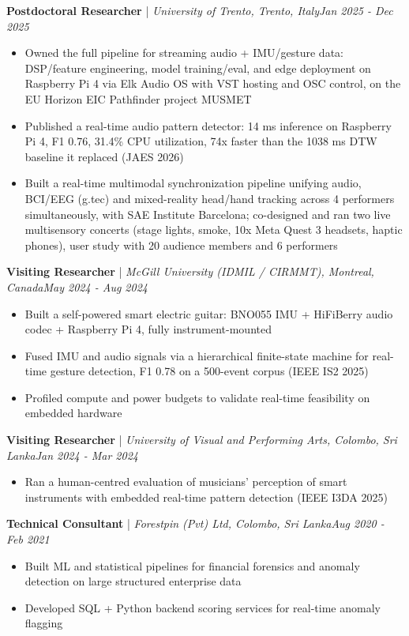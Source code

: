 \documentclass[11pt]{article}
\newenvironment{cvrole}[5]{%
  \par\noindent\textbf{\large #1} | \textit{\small #2, #3}\hfill \textit{\small #4 - #5}\par
  \begin{itemize}[leftmargin=2em, itemsep=-0.3em, topsep=-0.5em]%
}{%
  \end{itemize}\par\noindent\mbox{}\par\vspace{0.1em}%
}
\begin{document}
\begin{cvrole}{Postdoctoral Researcher}{University of Trento}{Trento, Italy}{Jan 2025}{Dec 2025}
    \item Owned the full pipeline for streaming audio + IMU/gesture data: DSP/feature engineering, model training/eval, and edge deployment on Raspberry Pi 4 via Elk Audio OS with VST hosting and OSC control, on the EU Horizon EIC Pathfinder project MUSMET
    \item Published a real-time audio pattern detector: 14 ms inference on Raspberry Pi 4, F1 0.76, 31.4\% CPU utilization, 74x faster than the 1038 ms DTW baseline it replaced (JAES 2026)
    \item Built a real-time multimodal synchronization pipeline unifying audio, BCI/EEG (g.tec) and mixed-reality head/hand tracking across 4 performers simultaneously, with SAE Institute Barcelona; co-designed and ran two live multisensory concerts (stage lights, smoke, 10x Meta Quest 3 headsets, haptic phones), user study with 20 audience members and 6 performers
\end{cvrole}

\begin{cvrole}{Visiting Researcher}{McGill University (IDMIL / CIRMMT)}{Montreal, Canada}{May 2024}{Aug 2024}
    \item Built a self-powered smart electric guitar: BNO055 IMU + HiFiBerry audio codec + Raspberry Pi 4, fully instrument-mounted
    \item Fused IMU and audio signals via a hierarchical finite-state machine for real-time gesture detection, F1 0.78 on a 500-event corpus (IEEE IS2 2025)
    \item Profiled compute and power budgets to validate real-time feasibility on embedded hardware
\end{cvrole}

\begin{cvrole}{Visiting Researcher}{University of Visual and Performing Arts}{Colombo, Sri Lanka}{Jan 2024}{Mar 2024}
    \item Ran a human-centred evaluation of musicians' perception of smart instruments with embedded real-time pattern detection (IEEE I3DA 2025)
\end{cvrole}

\begin{cvrole}{Technical Consultant}{Forestpin (Pvt) Ltd}{Colombo, Sri Lanka}{Aug 2020}{Feb 2021}
    \item Built ML and statistical pipelines for financial forensics and anomaly detection on large structured enterprise data
    \item Developed SQL + Python backend scoring services for real-time anomaly flagging
\end{cvrole}
\end{document}
